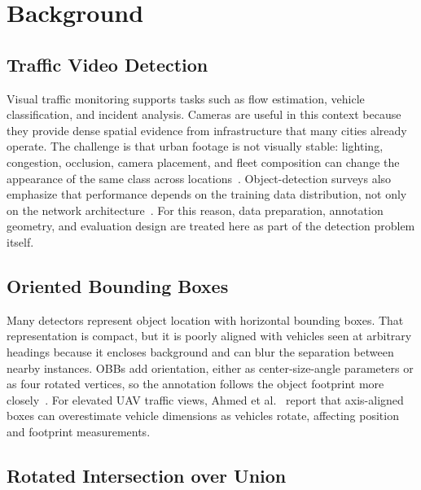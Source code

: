 \section{Background}
\label{sec:theoretical_background}

\subsection{Traffic Video Detection}
\label{sec:traffic_video_detection}

Visual traffic monitoring supports tasks such as flow estimation, vehicle classification, and incident analysis. Cameras are useful in this context because they provide dense spatial evidence from infrastructure that many cities already operate. The challenge is that urban footage is not visually stable: lighting, congestion, occlusion, camera placement, and fleet composition can change the appearance of the same class across locations~\cite{Zhou2025TrafficSurveillanceSurvey,Azfar2024ComplexTrafficReview}. Object-detection surveys also emphasize that performance depends on the training data distribution, not only on the network architecture~\cite{Zou2023ObjectDetectionSurvey}. For this reason, data preparation, annotation geometry, and evaluation design are treated here as part of the detection problem itself.

\subsection{Oriented Bounding Boxes}
\label{sec:oriented_bounding_boxes}

Many detectors represent object location with horizontal bounding boxes. That representation is compact, but it is poorly aligned with vehicles seen at arbitrary headings because it encloses background and can blur the separation between nearby instances. OBBs add orientation, either as center-size-angle parameters or as four rotated vertices, so the annotation follows the object footprint more closely~\cite{Wang2025OBBSurvey,Zand2022OBB}. For elevated UAV traffic views, Ahmed et al.~\cite{Ahmed2025} report that axis-aligned boxes can overestimate vehicle dimensions as vehicles rotate, affecting position and footprint measurements.

\subsection{Rotated Intersection over Union}
\label{sec:riou_metric}

